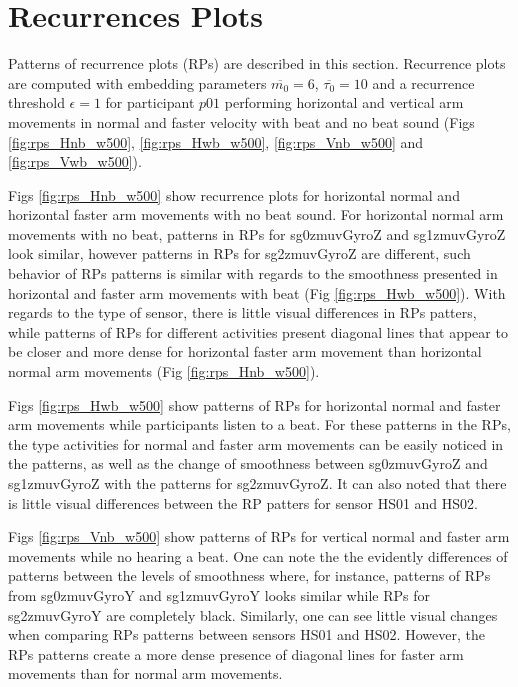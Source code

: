 \newpage
\section{Recurrences Plots}
Patterns of recurrence plots (RPs) are described in this section.
Recurrence plots are computed with embedding parameters 
$\overline{m_0}=6$, $\overline{\tau_0}=10$ and a recurrence 
threshold $\epsilon=1$ for participant $p01$ performing horizontal 
and vertical arm movements in normal and faster velocity 
with beat and no beat sound (Figs \ref{fig:rps_Hnb_w500}, 
\ref{fig:rps_Hwb_w500}, \ref{fig:rps_Vnb_w500} and \ref{fig:rps_Vwb_w500}).

Figs \ref{fig:rps_Hnb_w500} show recurrence plots for horizontal normal
and horizontal faster arm movements with no beat sound. 
For horizontal normal arm movements with no beat, patterns in 
RPs for sg0zmuvGyroZ and sg1zmuvGyroZ look similar, however
patterns in RPs for sg2zmuvGyroZ are different,
such behavior of RPs patterns is similar with regards to the smoothness 
presented in horizontal and faster arm movements with beat
(Fig \ref{fig:rps_Hwb_w500}).
With regards to the type of sensor, there is little visual differences in 
RPs patters, while patterns of RPs for different activities present diagonal 
lines that appear to be closer and more dense for horizontal faster 
arm movement than horizontal normal arm movements (Fig \ref{fig:rps_Hnb_w500}).

Figs \ref{fig:rps_Hwb_w500} show patterns of RPs for horizontal normal
and faster arm movements while participants listen to a beat. 
For these patterns in the RPs, the type activities for normal and 
faster arm movements can be easily noticed in the patterns,
as well as the change of smoothness between sg0zmuvGyroZ and sg1zmuvGyroZ
with the patterns for sg2zmuvGyroZ. It can also noted that there is 
little visual differences between the RP patters for sensor HS01 and HS02.

Figs \ref{fig:rps_Vnb_w500} show patterns of RPs for vertical normal
and faster arm movements while no hearing a beat. One can note the 
the evidently differences of patterns between the levels of smoothness 
where, for instance, patterns of RPs from sg0zmuvGyroY and sg1zmuvGyroY 
looks similar while RPs for sg2zmuvGyroY are completely black.
Similarly, one can see little visual changes when comparing RPs patterns 
between sensors HS01 and HS02. 
However, the RPs patterns create a more dense presence of diagonal lines
for faster arm movements than for normal arm movements. 

